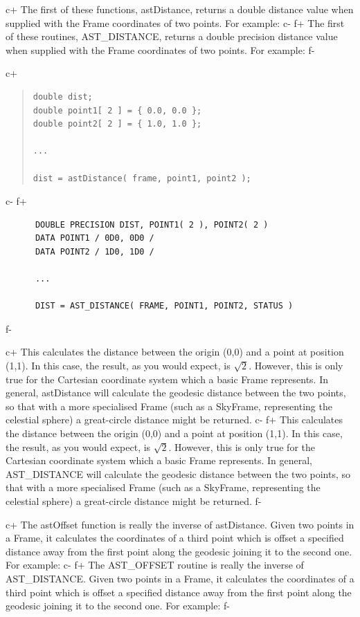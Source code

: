 \documentclass[twoside,11pt]{article}
\begin{document}
c+
The first of these functions, astDistance, returns a double distance
value when supplied with the Frame coordinates of two points. For
example:
c-
f+
The first of these routines, AST\_DISTANCE, returns a double precision
distance value when supplied with the Frame coordinates of two
points. For example:
f-

c+
\begin{quote}
\small
\begin{verbatim}
double dist;
double point1[ 2 ] = { 0.0, 0.0 };
double point2[ 2 ] = { 1.0, 1.0 };

...

dist = astDistance( frame, point1, point2 );
\end{verbatim}
\normalsize
\end{quote}
c-
f+
\small
\begin{verbatim}
      DOUBLE PRECISION DIST, POINT1( 2 ), POINT2( 2 )
      DATA POINT1 / 0D0, 0D0 /
      DATA POINT2 / 1D0, 1D0 /

      ...

      DIST = AST_DISTANCE( FRAME, POINT1, POINT2, STATUS )
\end{verbatim}
\normalsize
f-

c+
This calculates the distance between the origin (0,0) and a point at
position (1,1). In this case, the result, as you would expect, is
$\surd{2}$. However, this is only true for the Cartesian coordinate
system which a basic Frame represents. In general, astDistance will
calculate the geodesic distance between the two points, so that with a
more specialised Frame (such as a SkyFrame, representing the celestial
sphere) a great-circle distance might be returned.
c-
f+
This calculates the distance between the origin (0,0) and a point at
position (1,1). In this case, the result, as you would expect, is
$\surd{2}$. However, this is only true for the Cartesian coordinate
system which a basic Frame represents. In general, AST\_DISTANCE will
calculate the geodesic distance between the two points, so that with a
more specialised Frame (such as a SkyFrame, representing the celestial
sphere) a great-circle distance might be returned.
f-

c+
The astOffset function is really the inverse of astDistance. Given two
points in a Frame, it calculates the coordinates of a third point
which is offset a specified distance away from the first point along
the geodesic joining it to the second one. For example:
c-
f+
The AST\_OFFSET routine is really the inverse of AST\_DISTANCE. Given
two points in a Frame, it calculates the coordinates of a third point
which is offset a specified distance away from the first point along
the geodesic joining it to the second one. For example:
f-
\end{document}
